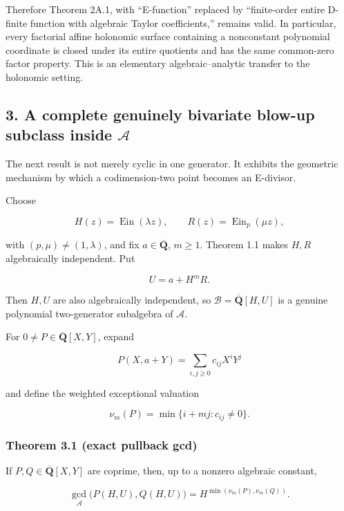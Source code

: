Therefore Theorem 2A.1, with ``E-function'' replaced by ``finite-order entire
D-finite function with algebraic Taylor coefficients,'' remains valid. In
particular, every factorial affine holonomic surface containing a nonconstant
polynomial coordinate is closed under its entire quotients and has the same
common-zero factor property. This is an elementary algebraic--analytic
transfer to the holonomic setting.

\subsection{\texorpdfstring{3. A complete genuinely bivariate blow-up subclass inside \(\mathscr A\)}{3. A complete genuinely bivariate blow-up subclass inside \textbackslash mathscr A}}

The next result is not merely cyclic in one generator. It exhibits the
geometric mechanism by which a codimension-two point becomes an E-divisor.

Choose

\[
  H(z)=\operatorname{Ein}(\lambda z),\qquad
  R(z)=\operatorname{Ein}_p(\mu z),
\]

with \((p,\mu)\ne(1,\lambda)\), and fix
\(a\in\overline{\mathbf Q}\), \(m\ge1\). Theorem 1.1 makes \(H,R\)
algebraically independent. Put

\[
  U=a+H^mR.                                                   \tag{J-3.1}
\]

Then \(H,U\) are also algebraically independent, so
\(\mathscr B=\overline{\mathbf Q}[H,U]\) is a genuine polynomial
two-generator subalgebra of \(\mathscr A\).

For \(0\ne P\in\overline{\mathbf Q}[X,Y]\), expand

\[
  P(X,a+Y)=\sum_{i,j\ge0}c_{ij}X^iY^j
\]

and define the weighted exceptional valuation

\[
  \nu_m(P)=\min\{i+mj:c_{ij}\ne0\}.                          \tag{J-3.2}
\]

\subsubsection{Theorem 3.1 (exact pullback gcd)}

If \(P,Q\in\overline{\mathbf Q}[X,Y]\) are coprime, then, up to a nonzero
algebraic constant,

\[
 \gcd_{\mathscr A}\bigl(P(H,U),Q(H,U)\bigr)
 =H^{\min(\nu_m(P),\nu_m(Q))}.                               \tag{J-3.3}
\]

